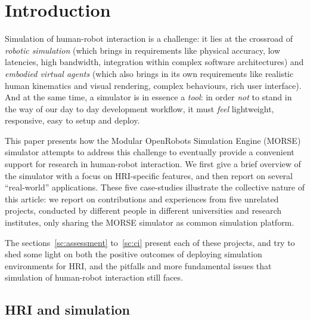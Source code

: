\documentclass[conference]{IEEEtran}
\begin{document}
\IEEEpeerreviewmaketitle

\section{Introduction}

Simulation of human-robot interaction is a challenge: it lies at the crossroad
of \emph{robotic simulation} (which brings in requirements like physical
accuracy, low latencies, high bandwidth, integration within complex software
architectures) and \emph{embodied virtual agents} (which also brings in its
own requirements like realistic human kinematics and visual rendering, complex
behaviours, rich user interface). And at the same time, a simulator is in
essence a \emph{tool}: in order \emph{not} to stand in the way of our day to day
development workflow, it must \emph{feel} lightweight, responsive, easy to setup
and deploy.

This paper presents how the Modular OpenRobots Simulation Engine
(MORSE)~\cite{Echeverria2011, morse_simpar_2012} simulator attempts to address
this challenge to eventually provide a convenient support for research in
human-robot interaction. We first give a brief overview of the simulator with a
focus on HRI-specific features, and then report on several ``real-world''
applications. These five case-studies illustrate the collective nature of this
article: we report on contributions and experiences from five unrelated
projects, conducted by different people in different universities and research
institutes, only sharing the MORSE simulator as common simulation platform.

The sections~\ref{sc:assessment} to~\ref{sc:ci} present each of these projects,
and try to shed some light on both the positive outcomes of deploying simulation
environments for HRI, and the pitfalls and more fundamental issues that
simulation of human-robot interaction still faces.

\subsection*{HRI and simulation}
\end{document}
